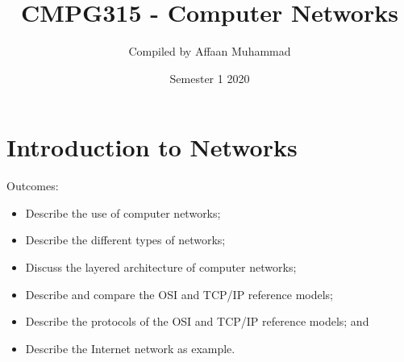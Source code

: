 \documentclass[a4paper, 12pt, titlepage]{report}
\begin{document}
\linespread{1.5}
\title{CMPG315 - Computer Networks}
\author{Compiled by Affaan Muhammad}
\date{Semester 1 2020}
\maketitle
\tableofcontents{}
\chapter{Introduction to Networks}
Outcomes:
\begin{itemize}
\item Describe the use of computer networks;
\item Describe the different types of networks;
\item Discuss the layered architecture of computer networks;
\item Describe and compare the OSI and TCP/IP reference models;
\item Describe the protocols of the OSI and TCP/IP reference models; and
\item Describe the Internet network as example.
\end{itemize}
\end{document}

